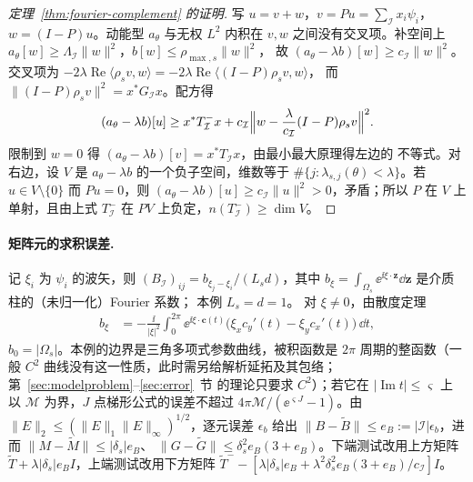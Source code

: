 \begin{proof}[定理~\ref{thm:fourier-complement} 的证明]
  写 $u=v+w$，$v=Pu=\sum_{\mathcal I}x_i\psi_i$，$w=(I-P)u$。动能型 $a_\theta$ 与无权
  $L^2$ 内积在 $v,w$ 之间没有交叉项。补空间上
  $a_\theta[w]\geq\Lambda_{\mathcal I}\lVert w\rVert^2$，$b[w]\leq\rho_{\max,s}\lVert w\rVert^2$，
  故 $(a_\theta-\lambda b)[w]\geq c_{\mathcal I}\lVert w\rVert^2$。交叉项为
  $-2\lambda\operatorname{Re}\langle\rho_sv,w\rangle=-2\lambda\operatorname{Re}\langle(I-P)\rho_sv,w\rangle$，
  而 $\lVert(I-P)\rho_sv\rVert^2=x^*G_{\mathcal I}x$。配方得
  \begin{align*}
    (a_\theta-\lambda b)[u]
    \geq x^*T^-_{\mathcal I}x
    +c_{\mathcal I}\Bigl\lVert w-\frac{\lambda}{c_{\mathcal I}}(I-P)\rho_sv\Bigr\rVert^2 .
  \end{align*}
  限制到 $w=0$ 得 $(a_\theta-\lambda b)[v]=x^*T_{\mathcal I}x$，由最小最大原理得左边的
  不等式。对右边，设 $V$ 是 $a_\theta-\lambda b$ 的一个负子空间，维数等于
  $\#\{j:\lambda_{s,j}(\theta)<\lambda\}$。若 $u\in V\setminus\{0\}$ 而 $Pu=0$，则
  $(a_\theta-\lambda b)[u]\geq c_{\mathcal I}\lVert u\rVert^2>0$，矛盾；所以 $P$ 在 $V$ 上
  单射，且由上式 $T^-_{\mathcal I}$ 在 $P V$ 上负定，$n(T^-_{\mathcal I})\geq\dim V$。
\end{proof}

\paragraph{矩阵元的求积误差.}
记 $\xi_i$ 为 $\psi_i$ 的波矢，则 $(B_{\mathcal I})_{ij}=b_{\xi_j-\xi_i}/(L_sd)$，其中
$b_\xi=\int_{\Omega_s}\ee^{\ii\xi\cdot\mathbf z}\dd\mathbf z$ 是介质柱的（未归一化）Fourier 系数；
本例 $L_s=d=1$。
对 $\xi\neq0$，由散度定理
\begin{align}
  b_\xi&=-\frac{\ii}{|\xi|^2}\int_0^{2\pi}\ee^{\ii\xi\cdot\boldsymbol c(t)}
  \bigl(\xi_xc_y'(t)-\xi_yc_x'(t)\bigr)\,\dd t ,
  \label{eq:inclusion-fourier}
\end{align}
$b_0=|\Omega_s|$。本例的边界是三角多项式参数曲线，被积函数是 $2\pi$ 周期的整函数（一般
$C^2$ 曲线没有这一性质，此时需另给解析延拓及其包络；第~\ref{sec:modelproblem}--\ref{sec:error}~节
的理论只要求 $C^2$）；若它在 $|\operatorname{Im}t|\leq\varsigma$ 上
以 $\mathcal M$ 为界，$J$ 点梯形公式的误差不超过 $4\pi\mathcal M/(\ee^{\varsigma J}-1)$。由
$\lVert E\rVert_2\leq(\lVert E\rVert_1\lVert E\rVert_\infty)^{1/2}$，逐元误差 $\epsilon_b$ 给出
$\lVert B-\widetilde B\rVert\leq e_B:=|\mathcal I|\epsilon_b$，进而
$\lVert M-\widetilde M\rVert\leq|\delta_s|e_B$、
$\lVert G-\widetilde G\rVert\leq\delta_s^2e_B(3+e_B)$。下端测试改用上方矩阵
$\widetilde T+\lambda|\delta_s|e_BI$，上端测试改用下方矩阵
$\widetilde T^--[\lambda|\delta_s|e_B+\lambda^2\delta_s^2e_B(3+e_B)/c_{\mathcal I}]I$。

